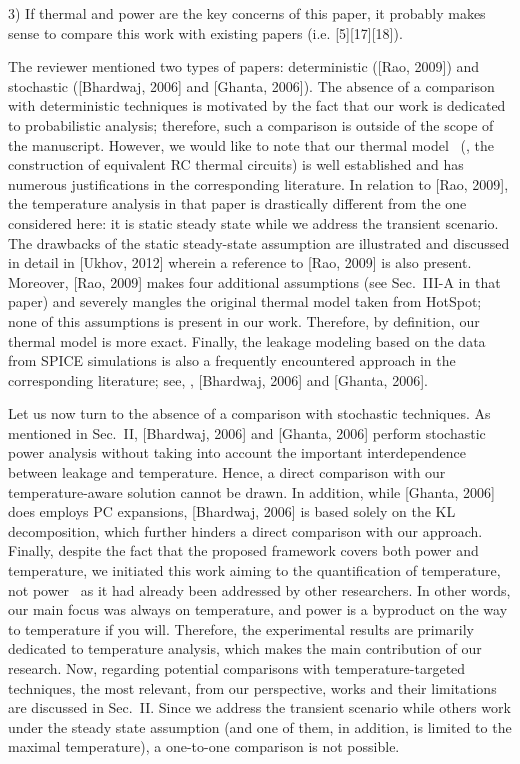 \begin{reviewer}
3) If thermal and power are the key concerns of this paper, it probably makes sense to compare this work with existing papers (i.e. [5][17][18]).
\end{reviewer}
\begin{authors}
The reviewer mentioned two types of papers: deterministic ([Rao, 2009]) and stochastic ([Bhardwaj, 2006] and [Ghanta, 2006]).
The absence of a comparison with deterministic techniques is motivated by the fact that our work is dedicated to probabilistic analysis; therefore, such a comparison is outside of the scope of the manuscript.
However, we would like to note that our thermal model \perse\ (\ie, the construction of equivalent RC thermal circuits) is well established and has numerous justifications in the corresponding literature.
In relation to [Rao, 2009], the temperature analysis in that paper is drastically different from the one considered here: it is static steady state while we address the transient scenario.
The drawbacks of the static steady-state assumption are illustrated and discussed in detail in [Ukhov, 2012] wherein a reference to [Rao, 2009] is also present.
Moreover, [Rao, 2009] makes four additional assumptions (see Sec.~III-A in that paper) and severely mangles the original thermal model taken from HotSpot; none of this assumptions is present in our work.
Therefore, by definition, our thermal model is more exact.
Finally, the leakage modeling based on the data from SPICE simulations is also a frequently encountered approach in the corresponding literature; see, \eg, [Bhardwaj, 2006] and [Ghanta, 2006].

Let us now turn to the absence of a comparison with stochastic techniques.
As mentioned in Sec.~II, [Bhardwaj, 2006] and [Ghanta, 2006] perform stochastic power analysis without taking into account the important interdependence between leakage and temperature.
Hence, a direct comparison with our temperature-aware solution cannot be drawn.
In addition, while [Ghanta, 2006] does employs PC expansions, [Bhardwaj, 2006] is based solely on the KL decomposition, which further hinders a direct comparison with our approach.
Finally, despite the fact that the proposed framework covers both power and temperature, we initiated this work aiming to the quantification of temperature, not power \perse\ as it had already been addressed by other researchers.
In other words, our main focus was always on temperature, and power is a byproduct on the way to temperature if you will.
Therefore, the experimental results are primarily dedicated to temperature analysis, which makes the main contribution of our research.
Now, regarding potential comparisons with temperature-targeted techniques, the most relevant, from our perspective, works and their limitations are discussed in Sec.~II.
Since we address the transient scenario while others work under the steady state assumption (and one of them, in addition, is limited to the maximal temperature), a one-to-one comparison is not possible.

\end{authors}
